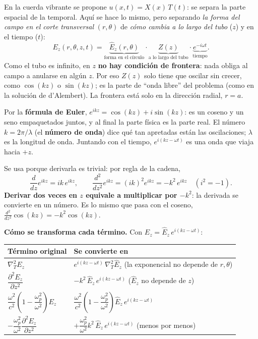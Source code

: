 \documentclass[11pt,a4paper]{article}
\renewcommand{\wp}{\omega_p}
\newcommand{\Kp}{\left(1-\dfrac{\wp^2}{\omega^2}\right)}
\begin{document}
\begin{idea}
En la cuerda vibrante se propone $u(x,t)=X(x)\,T(t)$: se separa la parte espacial de la temporal. Aquí se hace lo mismo, pero separando \emph{la forma del campo en el corte transversal} $(r,\theta)$ de \emph{cómo cambia a lo largo del tubo} ($z$) y en el tiempo ($t$):
\[
E_z(r,\theta,z,t)=\underbrace{\hat E_z(r,\theta)}_{\text{forma en el círculo}}\cdot\underbrace{Z(z)}_{\text{a lo largo del tubo}}\cdot\underbrace{e^{-i\omega t}}_{\text{tiempo}} .
\]
Como el tubo es infinito, en $z$ \textbf{no hay condición de frontera}: nada obliga al campo a anularse en algún $z$. Por eso $Z(z)$ solo tiene que oscilar sin crecer, como $\cos(kz)$ o $\sin(kz)$; es la parte de ``onda libre'' del problema (como en la solución de d'Alembert). La frontera está solo en la dirección radial, $r=a$.
\end{idea}

\begin{idea}
Por la \textbf{fórmula de Euler}, $e^{ikz}=\cos(kz)+i\sin(kz)$: es un coseno y un seno empaquetados juntos, y al final la parte física es la parte real. El número $k=2\pi/\lambda$ (el \textbf{número de onda}) dice qué tan apretadas están las oscilaciones; $\lambda$ es la longitud de onda. Juntando con el tiempo, $e^{i(kz-\omega t)}$ es una onda que viaja hacia $+z$.

Se usa porque derivarla es trivial: por regla de la cadena,
\[
\frac{d}{dz}e^{ikz}=ik\,e^{ikz},\qquad
\frac{d^2}{dz^2}e^{ikz}=(ik)^2e^{ikz}=-k^2\,e^{ikz}\quad(i^2=-1).
\]
\textbf{Derivar dos veces en $z$ equivale a multiplicar por $-k^2$}: la derivada se convierte en un número. Es lo mismo que pasa con el coseno, $\frac{d^2}{dz^2}\cos(kz)=-k^2\cos(kz)$.
\end{idea}

\noindent\textbf{Cómo se transforma cada término.} Con $E_z=\hat E_z\,e^{i(kz-\omega t)}$:
\begin{center}
\renewcommand{\arraystretch}{1.6}
\begin{tabular}{@{}ll@{}}
\toprule
Término original & Se convierte en \\
\midrule
$\nabla_T^2E_z$ & $e^{i(kz-\omega t)}\,\nabla_T^2\hat E_z$ \quad (la exponencial no depende de $r,\theta$) \\
$\dfrac{\partial^2E_z}{\partial z^2}$ & $-k^2\,\hat E_z\,e^{i(kz-\omega t)}$ \quad ($\hat E_z$ no depende de $z$) \\
$\dfrac{\omega^2}{c^2}\Kp E_z$ & $\dfrac{\omega^2}{c^2}\Kp\hat E_z\,e^{i(kz-\omega t)}$ \\
$-\dfrac{\wp^2}{\omega^2}\dfrac{\partial^2E_z}{\partial z^2}$ & $+\dfrac{\wp^2}{\omega^2}k^2\,\hat E_z\,e^{i(kz-\omega t)}$ \quad (menos por menos) \\
\bottomrule
\end{tabular}
\end{center}
\end{document}
